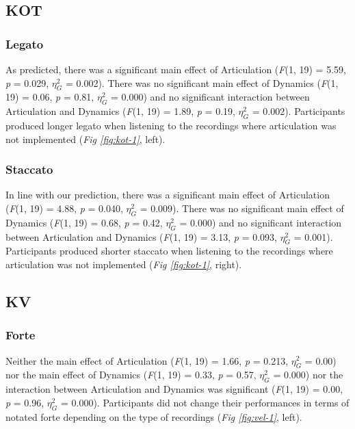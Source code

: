 \documentclass[
  man,floatsintext]{apa6}
\begin{document}
\hypertarget{kot}{%
\subsection{KOT}\label{kot}}

\hypertarget{legato}{%
\subsubsection{Legato}\label{legato}}

As predicted, there was a significant main effect of Articulation (\emph{F}(1, 19) = 5.59, \emph{p} = 0.029, \(\eta_G^2\) = 0.002). There was no significant main effect of Dynamics (\emph{F}(1, 19) = 0.06, \emph{p} = 0.81, \(\eta_G^2\) = 0.000) and no significant interaction between Articulation and Dynamics (\emph{F}(1, 19) = 1.89, \emph{p} = 0.19, \(\eta_G^2\) = 0.002). Participants produced longer legato when listening to the recordings where articulation was not implemented (\emph{Fig \ref{fig:kot-1}}, left).

\hypertarget{staccato}{%
\subsubsection{Staccato}\label{staccato}}

In line with our prediction, there was a significant main effect of Articulation (\emph{F}(1, 19) = 4.88, \emph{p} = 0.040, \(\eta_G^2\) = 0.009). There was no significant main effect of Dynamics (\emph{F}(1, 19) = 0.68, \emph{p} = 0.42, \(\eta_G^2\) = 0.000) and no significant interaction between Articulation and Dynamics (\emph{F}(1, 19) = 3.13, \emph{p} = 0.093, \(\eta_G^2\) = 0.001). Participants produced shorter staccato when listening to the recordings where articulation was not implemented (\emph{Fig \ref{fig:kot-1}}, right).

\hypertarget{kv}{%
\subsection{KV}\label{kv}}

\hypertarget{forte}{%
\subsubsection{Forte}\label{forte}}

Neither the main effect of Articulation (\emph{F}(1, 19) = 1.66, \emph{p} = 0.213, \(\eta_G^2\) = 0.00) nor the main effect of Dynamics (\emph{F}(1, 19) = 0.33, \emph{p} = 0.57, \(\eta_G^2\) = 0.000) nor the interaction between Articulation and Dynamics was significant (\emph{F}(1, 19) = 0.00, \emph{p} = 0.96, \(\eta_G^2\) = 0.000). Participants did not change their performances in terms of notated forte depending on the type of recordings (\emph{Fig \ref{fig:vel-1}}, left).
\end{document}
